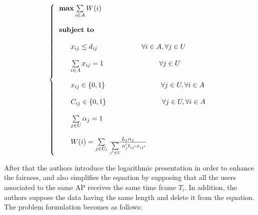 \documentclass[journal,transmag]{IEEEtran}
\begin{document}
\begin{footnotesize}
\begin{equation}
\left\{
\begin{tabular}{l} 
$\textbf{max}  \sum\limits_{i \in A} W(i) $ \\         
\\
\textbf{subject to} \\

\\
~~~~~$ x_{ij} \leq  d_{ij} $ ~~~~~~~~~~~~~~~~~ $ \forall i \in A, \forall j \in U$  \\

\\
~~~~~$ \sum\limits_{i \in A} x_{ij} = 1 $ ~~~~~~~~~~~~~~~~~~~~~~ $\forall j \in U $  \\

\\
~~~~~$ x_{ij} \in \{0,1 \} $ ~~~~~~~~~~~~~~~~~~~~~~ $\forall j \in U,  \forall i \in A $  \\

\\
~~~~~$ C_{ij} \in \{0,1 \} $ ~~~~~~~~~~~~~~~~~~~~~~ $\forall j \in U,  \forall i \in A $  \\

\\
~~~~~$ \sum\limits_{j \in U} \alpha_j = 1 $ ~~~~~~~~~~~~~~~~~~~~~~ \\

\\
~~~~~$ W(i)= \sum\limits_{j \in U_i} \frac{L_j \alpha_j}{\sum\limits_{j' \in U} \alpha_j' t_{ij'}   x_{ij'}} $ ~~~~~~~~~~~~~~~~~~~~~~ \\


\end{tabular}
\right.
\end{equation}
\end{footnotesize}

After that the authors introduce the logarithmic presentation in order to enhance the fairness, and also simplifies the equation by supposing that all the users associated to the same AP receives the same time frame $T_i$. In addition, the authors suppose the data having the same length and delete it from the equation. The problem formulation becomes as follows:  \\
\end{document}
